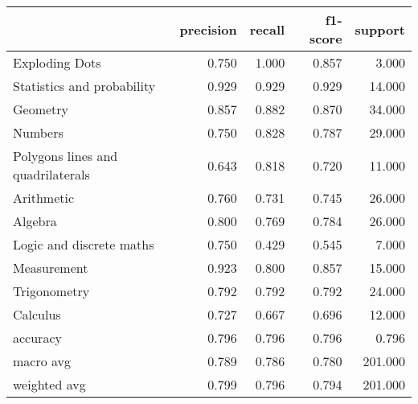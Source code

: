 \begin{tabular}{lrrrr}
\toprule
{} &  precision &  recall &  f1-score &  support \\
\midrule
Exploding Dots                    &      0.750 &   1.000 &     0.857 &    3.000 \\
Statistics and probability        &      0.929 &   0.929 &     0.929 &   14.000 \\
Geometry                          &      0.857 &   0.882 &     0.870 &   34.000 \\
Numbers                           &      0.750 &   0.828 &     0.787 &   29.000 \\
Polygons lines and quadrilaterals &      0.643 &   0.818 &     0.720 &   11.000 \\
Arithmetic                        &      0.760 &   0.731 &     0.745 &   26.000 \\
Algebra                           &      0.800 &   0.769 &     0.784 &   26.000 \\
Logic and discrete maths          &      0.750 &   0.429 &     0.545 &    7.000 \\
Measurement                       &      0.923 &   0.800 &     0.857 &   15.000 \\
Trigonometry                      &      0.792 &   0.792 &     0.792 &   24.000 \\
Calculus                          &      0.727 &   0.667 &     0.696 &   12.000 \\
accuracy                          &      0.796 &   0.796 &     0.796 &    0.796 \\
macro avg                         &      0.789 &   0.786 &     0.780 &  201.000 \\
weighted avg                      &      0.799 &   0.796 &     0.794 &  201.000 \\
\bottomrule
\end{tabular}
